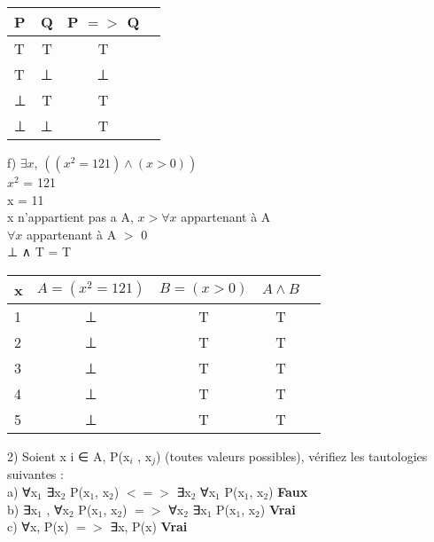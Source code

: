 \begin{tabular}{|l|c|c|c|}
  \hline
  P & Q & P $=>$ Q \\
  \hline
  T & T & T \\
  T & ⊥ & ⊥ \\
  ⊥ & T & T \\
  ⊥ & ⊥ & T \\
  \hline
\end{tabular}

\vspace{10mm}

f) $∃x$, $((x^{2} = 121) ∧ (x > 0))$ \\

$x^{2}$ = 121 \\
x = 11 \\

x n'appartient pas a A, $x> ∀x$ appartenant à A \\

$∀x$ appartenant à A $>$ 0 \\

 ⊥ ∧ T = T \\

\begin{tabular}{|l|c|c|c|c|}
  \hline
  x & $A=(x^{2} = 121)$ & $B=(x > 0)$ & $A ∧ B$ \\
  \hline
  1 & ⊥ & T & T \\
  \hline
  2 & ⊥ & T & T \\
  \hline
  3 & ⊥ & T & T \\
  \hline
  4 & ⊥ & T & T \\
  \hline
  5 & ⊥ & T & T \\
  \hline
\end{tabular}

\vspace{4mm}

2) Soient x i ∈ A, P(x$_{i}$ , x$_{j}$) (toutes valeurs possibles), vérifiez les tautologies suivantes : \\

a) ∀x$_{1}$ ∃x$_{2}$ P(x$_{1}$, x$_{2}$) $<=>$ ∃x$_{2}$ ∀x$_{1}$ P(x$_{1}$, x$_{2}$) \textbf{Faux} \\

b) ∃x$_{1}$ , ∀x$_{2}$ P(x$_{1}$, x$_{2}$) $=>$ ∀x$_{2}$ ∃x$_{1}$ P(x$_{1}$, x$_{2}$) \textbf{Vrai} \\

c) ∀x, P(x) $=>$ ∃x, P(x) \textbf{Vrai} \\

\newpage

